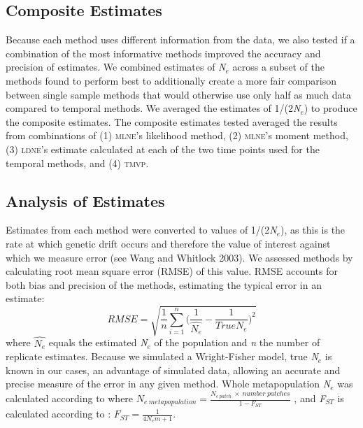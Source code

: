 \subsection{Composite Estimates}
Because each method uses different information from the data, we also tested if a combination of 
the most informative methods improved the accuracy and precision of estimates. We combined
estimates of \emph{N}$_e$ across a subset of the methods found to perform best to additionally 
create a more fair comparison between single sample methods that would otherwise use only half as 
much data compared to temporal methods. We averaged the estimates of 1/(2\emph{N}$_e$) to produce 
the composite estimates. The composite estimates tested averaged the results from combinations of 
(1) \textsc{mlne}'s likelihood method, (2) \textsc{mlne}'s moment method, (3) \textsc{ldne}'s 
estimate calculated at each of the two time points used for the temporal methods, and (4) \textsc{tmvp}.

\subsection{Analysis of Estimates}
Estimates from each method were converted to values of 1/(2\emph{N}$_e$), as this is the rate at 
which genetic drift occurs and therefore the value of interest against which we measure error 
(see Wang and Whitlock 2003). We assessed methods by calculating root mean square error (RMSE) 
of this value. RMSE accounts for both bias and precision of the methods, estimating the typical 
error in an estimate:
\begin{equation}
RMSE = \sqrt{ \frac{1}{n} \displaystyle\sum_{i=1}^{n} \Big( \frac{1}{\hat{N_e}} - \frac{1}{True N_e} \Big)^2}
\end{equation}
where $\hat{N_e}$ equals the estimated \emph{N}$_e$ of the population and \emph{n} the
number of replicate estimates. Because we simulated a Wright-Fisher model, true \emph{N}$_e$ 
is known in our cases, an advantage of simulated data, allowing an accurate and precise measure of
the error in any given method. Whole metapopulation \emph{N}$_e$ was
calculated according to \citet{Wright:1943} where 
$N_{e ~ metapopulation} = \frac{N_{e ~ patch} ~ \times ~ number ~ patches}{1 - F_{ST}}$
, and \emph{F}$_{ST}$ is calculated according to \citet{Wright:1931}: 
$F_{ST} = \frac{1}{4N_em + 1}$.


